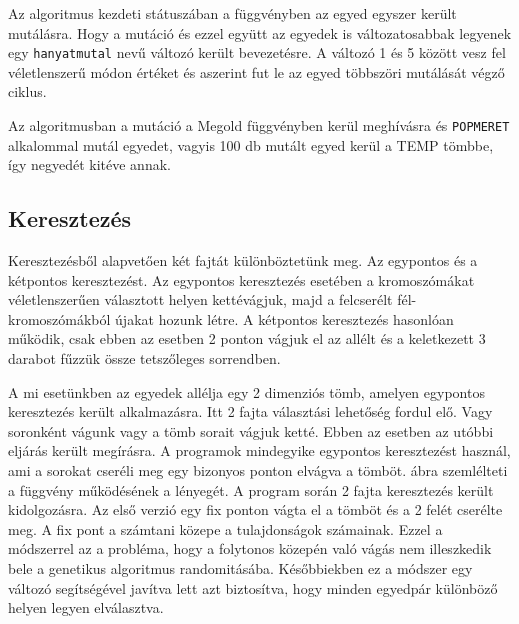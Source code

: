 \documentclass[12pt,a4paper,oneside]{report}
\begin{document}
		
	Az algoritmus kezdeti státuszában a függvényben az egyed egyszer került mutálásra. Hogy a mutáció és ezzel együtt az egyedek is változatosabbak legyenek egy \texttt{hanyatmutal} nevű változó került bevezetésre. A változó 1 és 5 között vesz fel véletlenszerű módon értéket 		és aszerint fut le az egyed többszöri mutálását végző ciklus.
	
	Az algoritmusban a mutáció a Megold függvényben kerül meghívásra és \texttt{POPMERET} alkalommal mutál egyedet, vagyis 100 db mutált egyed kerül a TEMP tömbbe, így negyedét kitéve annak.

            
        \subsection{Keresztezés} %
            
            Keresztezésből alapvetően két fajtát különböztetünk meg.
            Az egypontos és a kétpontos keresztezést.
            Az egypontos keresztezés esetében a kromoszómákat véletlenszerűen választott helyen kettévágjuk, majd a felcserélt fél-kromoszómákból újakat hozunk létre.
            A kétpontos keresztezés hasonlóan működik, csak ebben az esetben 2 ponton vágjuk el az allélt és a keletkezett 3 darabot fűzzük össze tetszőleges sorrendben.
                        
            A mi esetünkben az egyedek allélja egy 2 dimenziós tömb, amelyen egypontos keresztezés került alkalmazásra.
            Itt 2 fajta választási lehetőség fordul elő. Vagy soronként vágunk vagy a tömb sorait vágjuk ketté.
            Ebben az esetben az utóbbi eljárás került megírásra.
            A programok mindegyike egypontos keresztezést használ, ami a sorokat cseréli meg egy bizonyos ponton elvágva a tömböt.
             ábra szemlélteti a függvény működésének a lényegét.
            A program során 2 fajta keresztezés került kidolgozásra.
            Az első verzió egy fix ponton vágta el a tömböt és a 2 felét cserélte meg.
            A fix pont a számtani közepe a tulajdonságok számainak. Ezzel a módszerrel az a probléma, hogy a folytonos közepén való vágás nem illeszkedik bele a genetikus algoritmus randomitásába. Későbbiekben ez a módszer egy változó segítségével javítva lett azt biztosítva, hogy minden egyedpár különböző helyen legyen elválasztva.
            
                     
\end{document}
